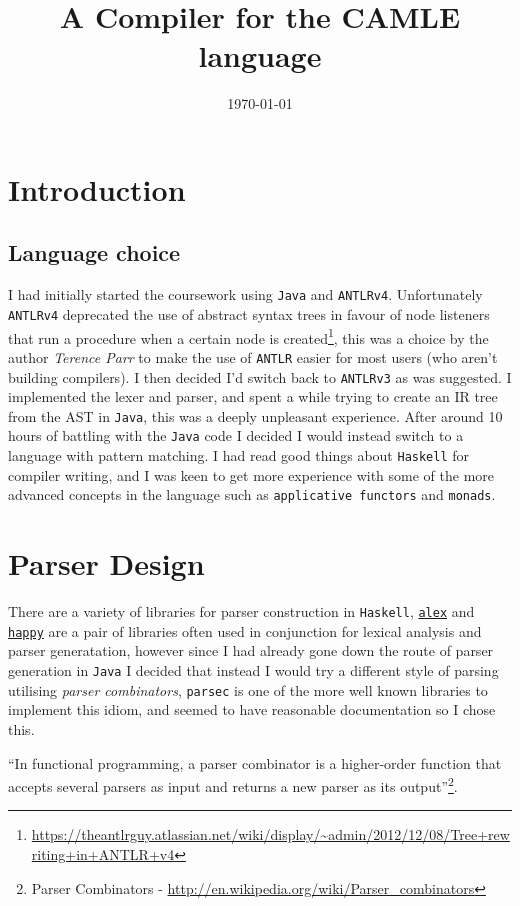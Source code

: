\documentclass[11pt]{article}
\date{\today}
\title{A Compiler for the CAMLE language}
\begin{document}
\maketitle
\tableofcontents

\section{Introduction}
\label{sec-1}
\subsection{Language choice}
\label{sec-1-1}
I had initially started the coursework using \verb~Java~ and
\verb~ANTLRv4~. Unfortunately \verb~ANTLRv4~ deprecated the use of abstract
syntax trees in favour of node listeners that run a procedure when a
certain node is created\footnote{\url{https://theantlrguy.atlassian.net/wiki/display/~admin/2012/12/08/Tree+rewriting+in+ANTLR+v4}}, this was a choice by
the author \emph{Terence Parr} to make the use of \verb~ANTLR~ easier for most
users (who aren't building compilers). I then decided I'd switch back
to \verb~ANTLRv3~ as was suggested. I implemented the lexer and parser, and
spent a while trying to create an IR tree from the AST in \verb~Java~, this
was a deeply unpleasant experience. After around 10 hours of battling
with the \verb~Java~ code I decided I would instead switch to a language
with pattern matching. I had read good things about \verb~Haskell~ for
compiler writing, and I was keen to get more experience with some of
the more advanced concepts in the language such as \verb~applicative functors~ and \verb~monads~.
\section{Parser Design}
\label{sec-2}
There are a variety of libraries for parser construction in \verb~Haskell~,
\href{https://www.haskell.org/alex/doc/html/}{\verb~alex~} and \href{https://www.haskell.org/happy/}{\verb~happy~} are a pair of libraries often used in conjunction
for lexical analysis and parser generatation, however since I had
already gone down the route of parser generation in \verb~Java~ I decided
that instead I would try a different style of parsing utilising
\emph{parser combinators}, \verb~parsec~ is one of the more well known libraries
to implement this idiom, and seemed to have reasonable documentation
so I chose this.


``In functional programming, a parser combinator is a higher-order
function that accepts several parsers as input and returns a new
parser as its output''\footnote{Parser Combinators - \url{http://en.wikipedia.org/wiki/Parser_combinators}}.
\end{document}
